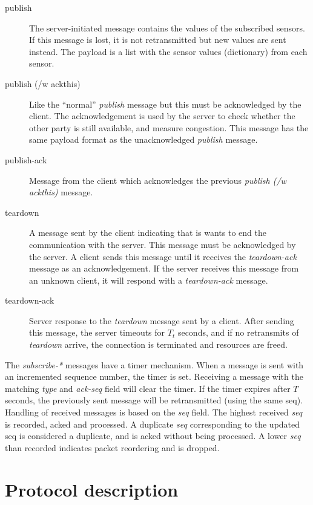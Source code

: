 \documentclass[a4paper]{article}
\begin{document}
\begin{description}
	\item[publish] The server-initiated message contains the values of
	the subscribed sensors. If this message is lost, it is not retransmitted but
	new values are sent instead. The payload is a list with the sensor values 
    (dictionary) from each sensor.
    
	\item[publish (/w ackthis)] Like the ``normal'' \emph{publish} message
	but this must be acknowledged by the client. The acknowledgement is used
	by the server to check whether the other party is still	available, and measure
    congestion. This message has the same payload format as the unacknowledged
    \emph{publish} message.
    
	\item[publish-ack] Message from the client which acknowledges the previous
	\emph{publish (/w ackthis)} message.
    
	\item[teardown] A message sent by the client indicating that is 
	wants to end the communication with the server. This message must be 
	acknowledged by the server. A client sends this message until it receives 
	the \emph{teardown-ack} message as an acknowledgement. If the server 
	receives this message from an unknown client, it will respond with a
	\emph{teardown-ack} message.
    
	\item[teardown-ack] Server response to the \emph{teardown} message
	sent by a client. After sending this message, the server timeouts for $T_t$
    seconds, and if no retransmits of \emph{teardown} arrive, the connection is
    terminated and resources are freed.
\end{description}

The \emph{subscribe-*} messages have a timer mechanism.
When a message is sent with an incremented sequence number, the timer is set.
Receiving a message with the matching \emph{type} and \emph{ack-seq} field will clear the timer.
If the timer expires after $T$ seconds, the previously sent message will be retransmitted (using the same seq).
Handling of received messages is based on the \emph{seq} field.
The highest received \emph{seq} is recorded, acked and processed.
A duplicate \emph{seq} corresponding to the updated seq is considered a duplicate, and is acked without being processed.
A lower \emph{seq} than recorded indicates packet reordering and is dropped.

\section{Protocol description}
\end{document}
